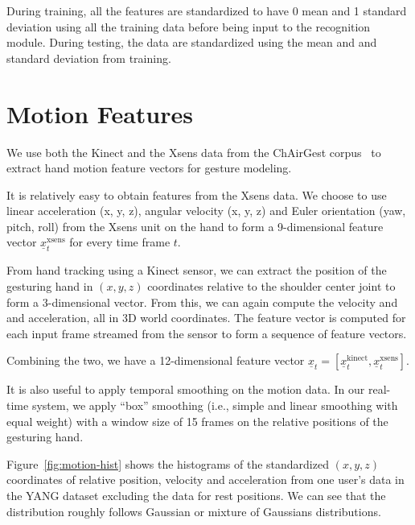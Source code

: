 During training, all the features are standardized to have 0 mean and 1 standard
deviation using all the training data before being input to the recognition
module. During testing, the data are standardized using the mean and and
standard deviation from training.

\section{Motion Features}
We use both the Kinect and the Xsens data from the ChAirGest corpus~\cite{Ruffieux2013} to
extract hand motion feature vectors for gesture modeling.

It is relatively easy to obtain features from the Xsens data. We choose to use linear
acceleration (x, y, z), angular velocity (x, y, z) and Euler orientation (yaw, pitch, roll)
from the Xsens unit on the hand to form a 9-dimensional feature vector $\underline{x}_t^{\text{xsens}}$
for every time frame $t$.

From hand tracking using a Kinect sensor, we can extract the position of the
gesturing hand in $(x, y, z)$ coordinates relative to the shoulder center joint to
form a 3-dimensional vector. From this, we can again compute  the 
velocity and and acceleration, all in 3D world coordinates. The feature vector
is computed for each input frame streamed from the sensor to form a sequence of
feature vectors.

Combining the two, we
have a 12-dimensional feature vector $\underline{x}_t = [\underline{x}^\text{kinect}_t, \underline{x}^\text{xsens}_t]$.

It is also useful to apply temporal smoothing on the motion data. In our
real-time system, we apply ``box'' smoothing (i.e., simple and linear smoothing
with equal weight) with a window size of 15 frames on the relative positions of
the gesturing hand.

Figure~\ref{fig:motion-hist} shows the histograms of the standardized $(x, y,
z)$ coordinates of relative position, velocity and acceleration from one user's
data in the YANG dataset excluding the data for rest positions. We can see that
the distribution roughly follows Gaussian or mixture of Gaussians distributions.

